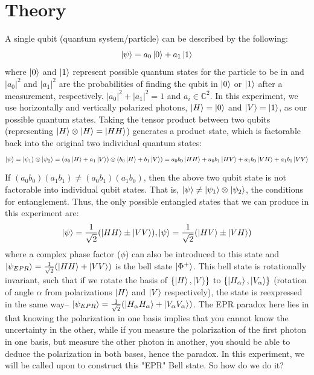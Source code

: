 \documentclass{article}
\newcommand{\tens}[1]{%
  \mathbin{\mathop{\otimes}\displaylimits_{#1}}%
}
\begin{document}
\section{Theory}
    A single qubit (quantum system/particle) can be described by the following:
    \begin{equation}
        \left\vert{\psi}\right\rangle = a_0\left\vert{0}\right\rangle + a_1\left\vert{1}\right\rangle
    \end{equation}
    where $\left\vert{0}\right\rangle$ and $\left\vert{1}\right\rangle$ represent possible quantum states for the particle to be in and $|a_0|^2$ and $|a_1|^2$ are the probabilities of finding the qubit in $\left\vert{0}\right\rangle$ or $\left\vert{1}\right\rangle$ after a measurement, respectively. $|a_0|^2+|a_1|^2 = 1$ and $a_i\in \mathbb{C}^2$. In this experiment, we use horizontally and vertically polarized photons, $\left\vert{H}\right\rangle = \left\vert{0}\right\rangle$ and $\left\vert{V}\right\rangle = \left\vert{1}\right\rangle$, as our possible quantum states. 
    Taking the tensor product between two qubits (representing $\ket{H}\tens{}\ket{H} = \ket{HH}$) generates a product state, which is factorable back into the original two individual quantum states:
    \begin{equation}
        \ket{\psi} = \ket{\psi_1}\tens{}\ket{\psi_2} = (a_0\ket{H} + a_1\ket{V})\tens{}(b_0\ket{H} + b_1\ket{V}) = a_0b_0\ket{HH} + a_0b_1\ket{HV} + a_1b_0\ket{VH} + a_1b_1\ket{VV}
    \end{equation}
    If $(a_0b_0)(a_1b_1)\neq (a_0b_1)(a_1b_0)$, then the above two qubit state is not factorable into individual qubit states. That is, $\ket{\psi} \neq \ket{\psi_1}\tens{}\ket{\psi_2}$, the conditions for entanglement. Thus, the only possible entangled states that we can produce in this experiment are:
    \begin{equation}
        \left\vert{\psi}\right\rangle = \frac{1}{\sqrt{2}}(\left\vert{HH}\right\rangle \pm \left\vert{VV}\right\rangle), \left\vert{\psi}\right\rangle = \frac{1}{\sqrt{2}}(\left\vert{HV}\right\rangle \pm \left\vert{VH}\right\rangle)
    \end{equation}
    where a complex phase factor ($\phi$) can also be introduced to this state and $\left\vert{\psi_{EPR}}\right\rangle = \frac{1}{\sqrt{2}}(\left\vert{HH}\right\rangle + \left\vert{VV}\right\rangle)$ is the bell state $\left\vert{\Phi^+}\right\rangle$. This bell state is rotationally invariant, such that if we rotate the basis of $\{\left\vert{H}\right\rangle,\left\vert{V}\right\rangle\}$ to $\{\left\vert{H_\alpha}\right\rangle,\left\vert{V_\alpha}\right\rangle\}$ (rotation of  angle $\alpha$ from polarizations $\left\vert{H}\right\rangle$ and $\left\vert{V}\right\rangle$ respectively), the state is reexpressed in the same way– $\left\vert{\psi_{EPR}}\right\rangle = \frac{1}{\sqrt{2}}(\left\vert{H_\alpha H_\alpha}\right\rangle + \left\vert{V_\alpha V_\alpha}\right\rangle)$. The EPR paradox here lies in that knowing the polarization in one basis implies that you cannot know the uncertainty in the other, while if you measure the polarization of the first photon in one basis, but measure the other photon in another, you should be able to deduce the polarization in both bases, hence the paradox. In this experiment, we will be called upon to construct this "EPR" Bell state. So how do we do it?
\end{document}
